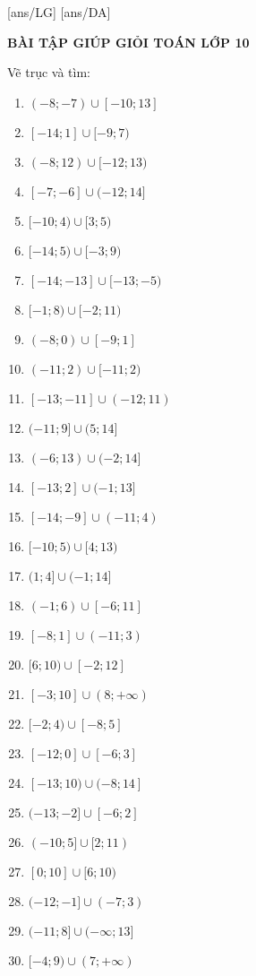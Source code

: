 \documentclass[12pt,a4paper]{article}
\begin{document}
	[ans/LG]
	[ans/DA]
	\pagestyle{fancy}
	\fancyhf{}
	\begin{center}
		{\bf\Large BÀI TẬP GIÚP GIỎI TOÁN LỚP 10}
	\end{center}

\begin{ex}
	Vẽ trục và tìm:
	\begin{enumerate}
		\item $(-8;-7)\cup[-10;13]$
		\item $[-14;1]\cup[-9;7)$
		\item $(-8;12)\cup[-12;13)$
		\item $[-7;-6]\cup(-12;14]$
		\item $[-10;4)\cup[3;5)$
		\item $[-14;5)\cup[-3;9)$
		\item $[-14;-13]\cup[-13;-5)$
		\item $[-1;8)\cup[-2;11)$
		\item $(-8;0)\cup[-9;1]$
		\item $(-11;2)\cup[-11;2)$
		\item $[-13;-11]\cup(-12;11)$
		\item $(-11;9]\cup(5;14]$
		\item $(-6;13)\cup(-2;14]$
		\item $[-13;2]\cup(-1;13]$
		\item $[-14;-9]\cup(-11;4)$
		\item $[-10;5)\cup[4;13)$
		\item $(1;4]\cup(-1;14]$
		\item $(-1;6)\cup[-6;11]$
		\item $[-8;1]\cup(-11;3)$
		\item $[6;10)\cup[-2;12]$
		\item $[-3;10]\cup(8;+ \infty)$
		\item $[-2;4)\cup[-8;5]$
		\item $[-12;0]\cup[-6;3]$
		\item $[-13;10)\cup(-8;14]$
		\item $(-13;-2]\cup[-6;2]$
		\item $(-10;5]\cup[2;11)$
		\item $[0;10]\cup[6;10)$
		\item $(-12;-1]\cup(-7;3)$
		\item $(-11;8]\cup(-\infty;13]$
		\item $[-4;9)\cup(7;+ \infty)$

\end{enumerate}
\end{ex}
\end{document}
